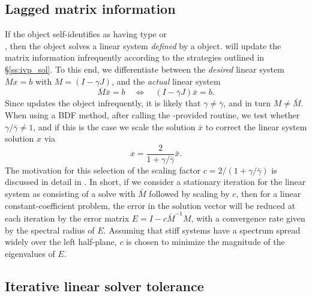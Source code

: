 \subsection{Lagged matrix information}
\label{ss:sunlinsol_lagged_matrix}

If the {\sunlinsol} object self-identifies as having type
 or \\ \noindent
{}, then the {\sunlinsol} object solves a
linear system \emph{defined} by a {\sunmatrix} object. {\cvls} will update the
matrix information infrequently according to the strategies outlined in
\S\ref{ss:ivp_sol}. To this end, we differentiate between the \emph{desired}
linear system $Mx=b$ with $M = (I-\gamma J)$, and the \emph{actual}
linear system
\[
  \bar{M}\bar{x} = b \quad\Leftrightarrow\quad (I-\bar{\gamma} J)\bar{x} = b.
\]
Since {\cvls} updates the {\sunmatrix} object infrequently, it is
likely that $\gamma\ne\bar{\gamma}$, and in turn $M\ne\bar{M}$.
When using a BDF method, after calling the {\sunlinsol}-provided 
routine, we test whether $\gamma / \bar{\gamma} \ne 1$, and if this is
the case we scale the solution $\bar{x}$ to correct the linear system
solution $x$ via
\begin{equation}
  \label{eq:rescaling}
  x = \frac{2}{1 + \gamma / \bar{\gamma}} \bar{x}.
\end{equation}
The motivation for this selection of the scaling factor $c = 2/(1 +
\gamma/\bar{\gamma})$ is discussed in detail in \cite{BBH:89,Hin:00}.
In short, if we consider a stationary iteration for the linear system
as consisting of a solve with $\bar{M}$ followed by scaling by $c$,
then for a linear constant-coefficient problem, the error in the
solution vector will be reduced at each iteration by the error matrix
$E = I - c \bar{M}^{-1} M$, with a convergence rate given by the
spectral radius of $E$.  Assuming that stiff systems have a spectrum
spread widely over the left half-plane, $c$ is chosen to minimize the
magnitude of the eigenvalues of $E$.


\subsection{Iterative linear solver tolerance}
\label{ss:sunlinsol_iterative_tolerance}

